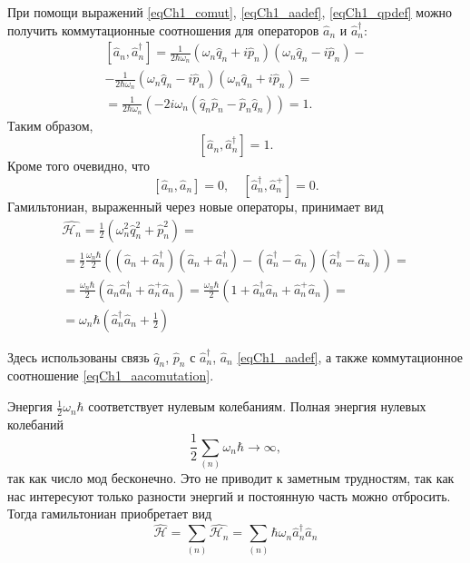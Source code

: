 При помощи выражений \eqref{eqCh1_comut}, 
\eqref{eqCh1_aadef}, \eqref{eqCh1_qpdef} можно получить коммутационные
соотношения для операторов $\hat{a}_n$ и $\hat{a}_n^{\dag}$: 
\begin{eqnarray}
\left[\hat{a}_n, \hat{a}_n^{\dag}\right] = 
\frac{1}{2 \hbar \omega_n}
\left( \omega_n \hat{q}_n + i \hat{p}_n\right) 
\left( \omega_n \hat{q}_n - i \hat{p}_n\right) - 
\nonumber \\
- \frac{1}{2 \hbar \omega_n}
\left( \omega_n \hat{q}_n - i \hat{p}_n\right) 
\left( \omega_n \hat{q}_n + i \hat{p}_n\right) =
\nonumber \\
= \frac{1}{2 \hbar \omega_n}
\left( - 2 i \omega_n 
\left(\hat{q}_n \hat{p}_n - \hat{p}_n \hat{q}_n\right)\right) = 1.
\end{eqnarray}
Таким образом,
\begin{equation}
\left[\hat{a}_n, \hat{a}_n^{\dag}\right] = 1.
\label{eqCh1_aacomutation}
\end{equation}
Кроме того очевидно, что
\begin{equation}
\left[\hat{a}_n, \hat{a}_n\right] = 0,
\quad
\left[\hat{a}_n^{\dag}, \hat{a}_n^{+}\right] = 0.
\end{equation}
Гамильтониан, выраженный через новые операторы, принимает вид
\begin{eqnarray}
\hat{\mathcal{H}_n} = 
\frac{1}{2}\left(\omega_n^2 \hat{q}_n^2 + \hat{p}_n^2\right) = 
\nonumber \\
= \frac{1}{2}\frac{\omega_n \hbar}{2}
\left(
\left(\hat{a}_n + \hat{a}_n^{\dag} \right)
\left(\hat{a}_n + \hat{a}_n^{\dag} \right)
-
\left(\hat{a}_n^{\dag} - \hat{a}_n \right)
\left(\hat{a}_n^{\dag} - \hat{a}_n \right)
\right) =
\nonumber \\
= \frac{\omega_n \hbar}{2} 
\left( \hat{a}_n \hat{a}_n^{\dag} + \hat{a}_n^{+} \hat{a}_n\right) =
\frac{\omega_n \hbar}{2} 
\left(1 + \hat{a}_n^{\dag} \hat{a}_n + \hat{a}_n^{+} \hat{a}_n\right) =
\nonumber \\
= \omega_n \hbar 
\left(\hat{a}_n^{\dag} \hat{a}_n + \frac{1}{2}\right)
\label{eqCh1_quant_stoyachie_volny}
\end{eqnarray}


Здесь использованы связь  $\hat{q}_n$, $\hat{p}_n$ 
с $\hat{a}_n^{\dag}$, $\hat{a}_n$ \eqref{eqCh1_aadef}, а также
коммутационное соотношение \eqref{eqCh1_aacomutation}. 

Энергия $\frac{1}{2}\omega_n \hbar$ соответствует нулевым
колебаниям. Полная энергия нулевых колебаний
\[
\frac{1}{2}\sum_{(n)}\omega_n \hbar \to \infty,
\] 
так как число мод бесконечно. Это не приводит к 
заметным трудностям, так как нас интересуют только разности
энергий и постоянную часть можно отбросить. Тогда гамильтониан
приобретает вид 
\begin{equation}
\hat{\mathcal{H}} = \sum_{(n)}\hat{\mathcal{H}_n} =
\sum_{(n)}\hbar \omega_n \hat{a}_n^{\dag}\hat{a}_n
\end{equation}

